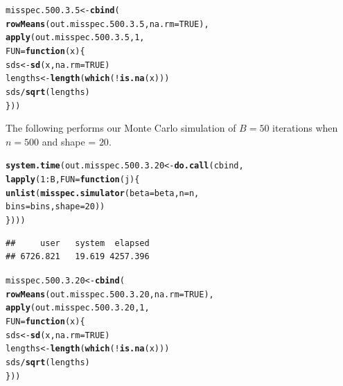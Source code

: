 \documentclass[11pt]{article}\usepackage[]{graphicx}\usepackage[]{color}
\makeatletter
\newcommand{\hlnum}[1]{\textcolor[rgb]{0.686,0.059,0.569}{#1}}%
\newcommand{\hlopt}[1]{\textcolor[rgb]{0,0,0}{#1}}%
\newcommand{\hlstd}[1]{\textcolor[rgb]{0.345,0.345,0.345}{#1}}%
\newcommand{\hlkwa}[1]{\textcolor[rgb]{0.161,0.373,0.58}{\textbf{#1}}}%
\newcommand{\hlkwb}[1]{\textcolor[rgb]{0.69,0.353,0.396}{#1}}%
\newcommand{\hlkwc}[1]{\textcolor[rgb]{0.333,0.667,0.333}{#1}}%
\newcommand{\hlkwd}[1]{\textcolor[rgb]{0.737,0.353,0.396}{\textbf{#1}}}%
\newenvironment{kframe}{%
 \def\at@end@of@kframe{}%
 \ifinner\ifhmode%
  \def\at@end@of@kframe{\end{minipage}}%
  \begin{minipage}{\columnwidth}%
 \fi\fi%
 \def\FrameCommand##1{\hskip\@totalleftmargin \hskip-\fboxsep
 \colorbox{shadecolor}{##1}\hskip-\fboxsep
     \hskip-\linewidth \hskip-\@totalleftmargin \hskip\columnwidth}%
 \MakeFramed {\advance\hsize-\width
   \@totalleftmargin\z@ \linewidth\hsize
   \@setminipage}}%
 {\par\unskip\endMakeFramed%
 \at@end@of@kframe}
\newenvironment{knitrout}{}{} %
\makeatother
\begin{document}
\begin{knitrout}
\color{fgcolor}\begin{kframe}
\begin{alltt}
\hlstd{misspec.500.3.5} \hlkwb{<-} \hlkwd{cbind}\hlstd{(}
  \hlkwd{rowMeans}\hlstd{(out.misspec.500.3.5,} \hlkwc{na.rm} \hlstd{=} \hlnum{TRUE}\hlstd{),}
  \hlkwd{apply}\hlstd{(out.misspec.500.3.5,} \hlnum{1}\hlstd{,}
  \hlkwc{FUN} \hlstd{=} \hlkwa{function}\hlstd{(}\hlkwc{x}\hlstd{)\{}
    \hlstd{sds} \hlkwb{<-} \hlkwd{sd}\hlstd{(x,} \hlkwc{na.rm} \hlstd{=} \hlnum{TRUE}\hlstd{)}
    \hlstd{lengths} \hlkwb{<-} \hlkwd{length}\hlstd{(}\hlkwd{which}\hlstd{(}\hlopt{!}\hlkwd{is.na}\hlstd{(x)))}
    \hlstd{sds} \hlopt{/} \hlkwd{sqrt}\hlstd{(lengths)}
  \hlstd{\}))}
\end{alltt}
\end{kframe}
\end{knitrout}

The following performs our Monte Carlo simulation of $B = 50$ iterations 
when $n = 500$ and shape = $20$.

\begin{knitrout}
\color{fgcolor}\begin{kframe}
\begin{alltt}
\hlkwd{system.time}\hlstd{(out.misspec.500.3.20} \hlkwb{<-} \hlkwd{do.call}\hlstd{(cbind,}
  \hlkwd{lapply}\hlstd{(}\hlnum{1}\hlopt{:}\hlstd{B,} \hlkwc{FUN} \hlstd{=} \hlkwa{function}\hlstd{(}\hlkwc{j}\hlstd{)\{}
    \hlkwd{unlist}\hlstd{(}\hlkwd{misspec.simulator}\hlstd{(}\hlkwc{beta} \hlstd{= beta,} \hlkwc{n} \hlstd{= n,}
      \hlkwc{bins} \hlstd{= bins,} \hlkwc{shape} \hlstd{=} \hlnum{20}\hlstd{))}
\hlstd{\})))}
\end{alltt}
\begin{verbatim}
##     user   system  elapsed 
## 6726.821   19.619 4257.396
\end{verbatim}
\end{kframe}
\end{knitrout}

\begin{knitrout}
\color{fgcolor}\begin{kframe}
\begin{alltt}
\hlstd{misspec.500.3.20} \hlkwb{<-} \hlkwd{cbind}\hlstd{(}
  \hlkwd{rowMeans}\hlstd{(out.misspec.500.3.20,} \hlkwc{na.rm} \hlstd{=} \hlnum{TRUE}\hlstd{),}
  \hlkwd{apply}\hlstd{(out.misspec.500.3.20,} \hlnum{1}\hlstd{,}
  \hlkwc{FUN} \hlstd{=} \hlkwa{function}\hlstd{(}\hlkwc{x}\hlstd{)\{}
    \hlstd{sds} \hlkwb{<-} \hlkwd{sd}\hlstd{(x,} \hlkwc{na.rm} \hlstd{=} \hlnum{TRUE}\hlstd{)}
    \hlstd{lengths} \hlkwb{<-} \hlkwd{length}\hlstd{(}\hlkwd{which}\hlstd{(}\hlopt{!}\hlkwd{is.na}\hlstd{(x)))}
    \hlstd{sds} \hlopt{/} \hlkwd{sqrt}\hlstd{(lengths)}
  \hlstd{\}))}
\end{alltt}
\end{kframe}
\end{knitrout}
\end{document}
